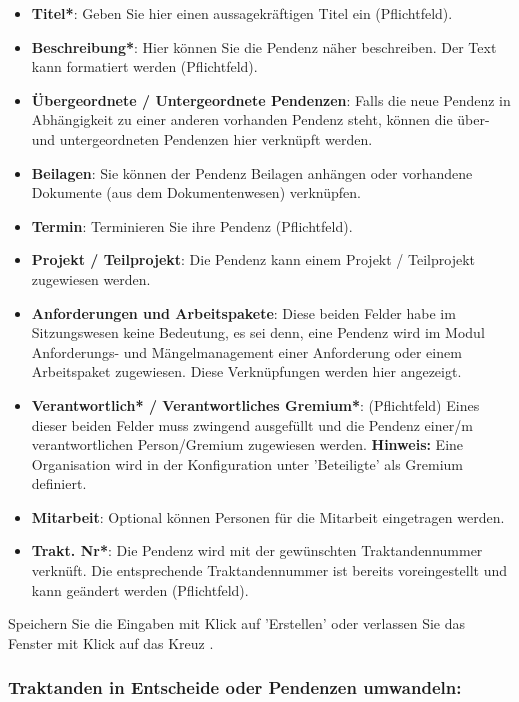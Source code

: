 \begin{itemize}
\item \textbf{Titel*}: Geben Sie hier einen aussagekräftigen Titel ein (Pflichtfeld).
\item \textbf{Beschreibung*}: Hier können Sie die Pendenz näher beschreiben. Der Text kann formatiert werden (Pflichtfeld).
\item \textbf{Übergeordnete / Untergeordnete Pendenzen}: Falls die neue Pendenz in Abhängigkeit zu einer anderen vorhanden Pendenz steht, können die über- und untergeordneten Pendenzen hier verknüpft werden.
\item \textbf{Beilagen}: Sie können der Pendenz Beilagen anhängen oder vorhandene Dokumente (aus dem Dokumentenwesen) verknüpfen. 
\item \textbf{Termin}: Terminieren Sie ihre Pendenz (Pflichtfeld).
\item \textbf{Projekt / Teilprojekt}: Die Pendenz kann einem Projekt / Teilprojekt zugewiesen werden.
\item \textbf{Anforderungen und Arbeitspakete}: Diese beiden Felder habe im Sitzungswesen keine Bedeutung, es sei denn, eine Pendenz wird im Modul Anforderungs- und Mängelmanagement einer Anforderung oder einem Arbeitspaket zugewiesen. Diese Verknüpfungen werden hier angezeigt.
\item \textbf{Verantwortlich* / Verantwortliches Gremium*}: (Pflichtfeld) Eines dieser beiden Felder muss zwingend ausgefüllt und die Pendenz einer/m verantwortlichen Person/Gremium zugewiesen werden. \textbf{Hinweis:} Eine Organisation wird in der Konfiguration unter 'Beteiligte' als Gremium definiert.
\item \textbf{Mitarbeit}: Optional können Personen für die Mitarbeit eingetragen werden.
\item \textbf{Trakt. Nr*}: Die Pendenz wird mit der gewünschten Traktandennummer verknüft. Die entsprechende Traktandennummer ist bereits voreingestellt und kann geändert werden (Pflichtfeld).
\end{itemize}

Speichern Sie die Eingaben mit Klick auf 'Erstellen'  oder verlassen Sie das Fenster mit Klick auf das Kreuz .

\vspace{\baselineskip}

\subsubsection{Traktanden in Entscheide oder Pendenzen umwandeln:}

